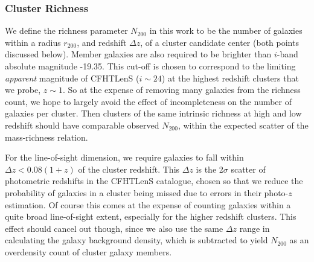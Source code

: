 \subsubsection{Cluster Richness}
\label{rich}
We define the richness parameter $N_{200}$ in this work to be the number of galaxies within a radius $r_{200}$, and redshift $\Delta z$, of a cluster candidate center (both points discussed below). Member galaxies are also required to be brighter than $i$-band absolute magnitude -19.35. This cut-off is chosen to correspond to the limiting {\it apparent} magnitude of \ac{CFHTLenS} ($i \sim 24$) at the highest redshift clusters that we probe, $z \sim 1$. So at the expense of removing many galaxies from the richness count, we hope to largely avoid the effect of incompleteness on the number of galaxies per cluster. Then clusters of the same intrinsic richness at high and low redshift should have comparable observed $N_{200}$, within the expected scatter of the mass-richness relation.

For the line-of-sight dimension, we require galaxies to fall within $\Delta z < 0.08(1+z)$ of the cluster redshift. This $\Delta z$ is the 2$\sigma$ scatter of photometric redshifts in the \ac{CFHTLenS} catalogue, chosen so that we reduce the probability of galaxies in a cluster being missed due to errors in their photo-$z$ estimation. Of course this comes at the expense of counting galaxies within a quite broad line-of-sight extent, especially for the higher redshift clusters. This effect should cancel out though, since we also use the same $\Delta z$ range in calculating the galaxy background density, which is subtracted to yield $N_{200}$ as an overdensity count of cluster galaxy members.

